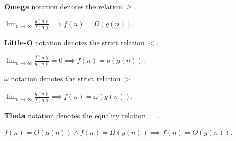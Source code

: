 \begin{definition}
	\textbf{Omega} notation denotes the relation \( \ge  \).
\end{definition}

\begin{lemma}
	\( \lim_{n \to \infty} \frac{g(n)}{f(n)} \implies f(n) = \Omega(g(n)) \).
\end{lemma}

\begin{definition}
	\textbf{Little-O} notation denotes the strict relation \( < \).
\end{definition}

\begin{lemma}
	\( \lim_{n \to \infty} \frac{f(n)}{g(n)}=0 \implies f(n) = o(g(n)) \).
\end{lemma}

\begin{definition}
	\( \omega \) notation denotes the strict relation \( > \).
\end{definition}

\begin{lemma}
	\( \lim_{n \to \infty} \frac{g(n)}{f(n)} \implies f(n) = \omega(g(n))\).
\end{lemma}

\begin{definition}
	\textbf{Theta} notation denotes the equality relation \( = \).
\end{definition}

\begin{lemma}
	\( f(n) = O(g(n)) \land f(n) = \Omega(g(n)) \implies f(n) = \Theta(g(n)) \).
\end{lemma}
